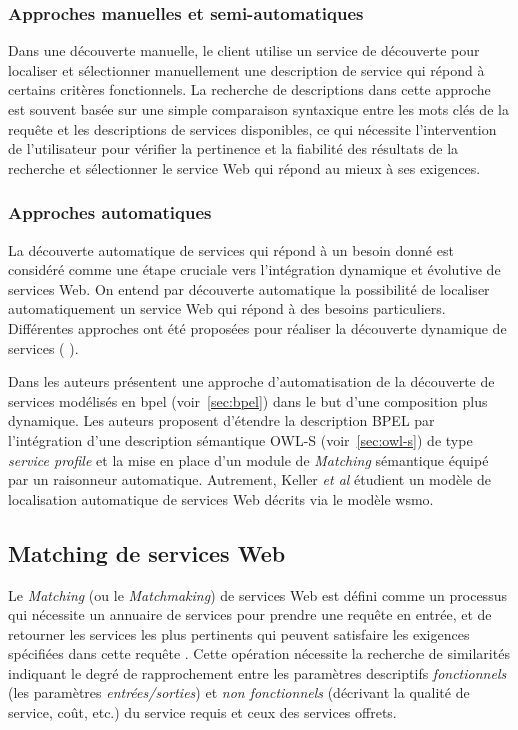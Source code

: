     \subsubsection{Approches manuelles et semi-automatiques}
    Dans une découverte manuelle, le client utilise un service de
    découverte pour localiser et sélectionner manuellement une
    description de service qui répond à certains critères
    fonctionnels. La recherche de descriptions dans cette approche est
    souvent basée sur une simple comparaison syntaxique entre les mots
    clés de la requête et les descriptions de services disponibles, ce
    qui nécessite l'intervention de l'utilisateur pour vérifier la
    pertinence et la fiabilité des résultats de la recherche et
    sélectionner le service Web qui répond au mieux à ses exigences.

    \subsubsection{Approches automatiques}
    La découverte automatique de services qui répond à un besoin donné
    est considéré comme une étape cruciale vers l'intégration
    dynamique et évolutive de services Web. On entend par découverte
    automatique la possibilité de localiser automatiquement un service
    Web qui répond à des besoins particuliers. Différentes approches
    ont été proposées pour réaliser la découverte dynamique de
    services ( \cite{paolucci2002semantic, bernstein2002discovering,
      mandell2003bottom,
      benatallah2005automating,keller2005automatic}).\medskip

    Dans \cite{mandell2003bottom} les auteurs présentent une approche
    d'automatisation de la découverte de services modélisés en
    \acrshort{bpel} (voir~\ref{sec:bpel}) dans le but d'une
    composition plus dynamique. Les auteurs proposent d'étendre la
    description \textsc{BPEL} par l'intégration d'une description
    sémantique \textsc{OWL-S} (voir~\ref{sec:owl-s}) de type
    \textit{service profile} et la mise en place d'un module de
    \textit{Matching} sémantique équipé par un raisonneur
    automatique. Autrement, Keller \textit{et al}
    \cite{keller2005automatic} étudient un modèle de localisation
    automatique de services Web décrits via le modèle \acrshort{wsmo}.

  \subsection{Matching de services Web}
  \label{sec:ws-matching}
  Le \textit{Matching} (ou le \textit{Matchmaking}) de services Web
  est défini comme un processus qui nécessite un annuaire de services
  pour prendre une requête en entrée, et de retourner les services les
  plus pertinents qui peuvent satisfaire les exigences spécifiées dans
  cette requête \cite{li2004software}. Cette opération nécessite la
  recherche de similarités indiquant le degré de rapprochement entre
  les paramètres descriptifs \textit{fonctionnels} (les paramètres
  \textit{entrées/sorties}) et \textit{non fonctionnels} (décrivant la
  qualité de service, coût, etc.) du service requis et ceux des
  services offrets.\medskip

